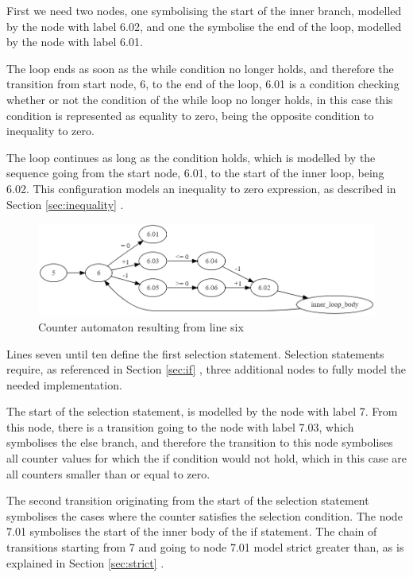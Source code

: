 \documentclass[12pt]{thesis}
\begin{document}
First we need two nodes, one symbolising the start of the inner branch, modelled by the node with label 6.02, and one the symbolise the end of the loop, modelled by the node with label 6.01.

The loop ends as soon as the while condition no longer holds, and therefore the transition from start node, 6, to the end of the loop, 6.01 is a condition checking whether or not the condition of the while loop no longer holds, in this case this condition is represented as equality to zero, being the opposite condition to inequality to zero. 

The loop continues as long as the condition holds, which is modelled by the sequence going from the start node, 6.01, to the start of the inner loop, being 6.02. This configuration models an inequality to zero expression, as described in Section \ref{sec:inequality} .

\begin{figure}[h]
	\centering
	\includegraphics[width=\linewidth]{final_overview_6}
	\caption{Counter automaton resulting from line six}
	\label{fig:final_overview_6}
\end{figure}

Lines seven until ten define the first selection statement. Selection statements require, as referenced in Section \ref{sec:if} , three additional nodes to fully model the needed implementation.

The start of the selection statement, is modelled by the node with label 7. From this node, there is a transition going to the node with label 7.03, which symbolises the else branch, and therefore the transition to this node symbolises all counter values for which the if condition would not hold, which in this case are all counters smaller than or equal to zero.

The second transition originating from the start of the selection statement symbolises the cases where the counter satisfies the selection condition. The node 7.01 symbolises the start of the inner body of the if statement. The chain of transitions starting from 7 and going to node 7.01 model strict greater than, as is explained in Section \ref{sec:strict} .
\end{document}
